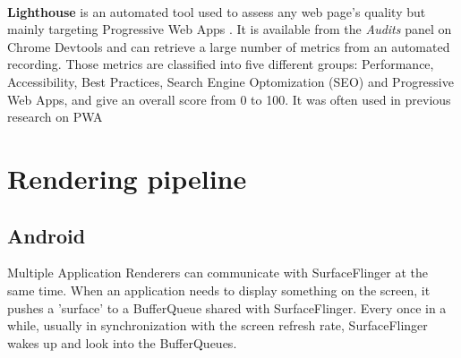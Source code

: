 \paragraph{}
\textbf{Lighthouse} \cite{lighthouse} is an automated  tool used to assess any web page's quality but mainly targeting Progressive Web Apps \cite{PWApossibleUnifer}. It is available from the \textit{Audits} panel on Chrome Devtools and can retrieve a large number of metrics from an automated recording. Those metrics are classified into five different groups: Performance, Accessibility, Best Practices, Search Engine Optomization (SEO) and Progressive Web Apps, and give an overall score from 0 to 100. It was often used in previous research on PWA \cite{}

\section{Rendering pipeline}

\subsection{Android}
Multiple Application Renderers can communicate with SurfaceFlinger at the same time.   When an application needs to display something on the screen, it pushes a 'surface' to a BufferQueue shared with SurfaceFlinger. Every once in a while, usually in synchronization with the screen refresh rate, SurfaceFlinger wakes up and look into the BufferQueues.

